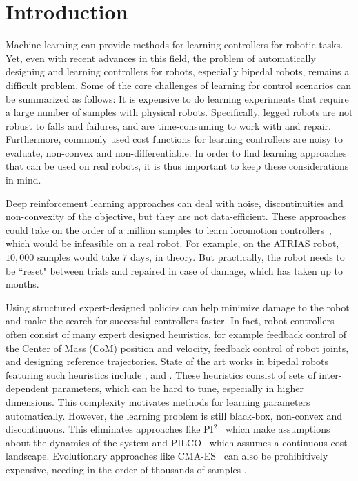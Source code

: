 \chapter{Introduction}
\label{chap:intro}

Machine learning can provide methods for learning controllers for robotic tasks. Yet, even with recent advances in this field, the problem of automatically designing and learning controllers for robots, especially bipedal robots, remains a difficult problem. Some of the core challenges of learning for control scenarios can be summarized as follows: It is expensive to do learning experiments that require a large number of samples with physical robots. Specifically, legged robots are not robust to falls and failures, and are time-consuming to work with and repair. Furthermore, commonly used cost functions for learning controllers are noisy to evaluate, non-convex and non-differentiable. In order to find learning approaches that can be used on real robots, it is thus important to keep these considerations in mind.

Deep reinforcement learning approaches can deal with noise, discontinuities and non-convexity of the objective, but they are not data-efficient. These approaches could take on the order of a million samples to learn locomotion controllers~\citep{peng2016terrain}, which would be infeasible on a real robot. For example, on the ATRIAS robot, $10,000$ samples would take $7$ days, in theory. But practically, the robot needs to be ``reset" between trials and repaired in case of damage, which has taken up to months. 

Using structured expert-designed policies can help minimize damage to the robot and make the search for successful controllers faster. In fact, robot controllers often consist of many expert designed heuristics, for example feedback control of the Center of Mass (CoM) position and velocity, feedback control of robot joints, and designing reference trajectories. State of the art works in bipedal robots featuring such heuristics include \cite{feng2015optimization}, \cite{kuindersma2016optimization} and \cite{hubicki2016walking}. These heuristics consist of sets of inter-dependent parameters, which can be hard to tune, especially in higher dimensions. This complexity motivates methods for learning parameters automatically. However, the learning problem is still black-box, non-convex and discontinuous. This eliminates approaches like PI$^2$~\citep{theodorou2010generalized} which make assumptions about the dynamics of the system and PILCO~\citep{deisenroth2011pilco} which assumes a continuous cost landscape. Evolutionary approaches like CMA-ES~\citep{hansen2006cma} can also be prohibitively expensive, needing in the order of thousands of samples \citep{song2015neural}.

